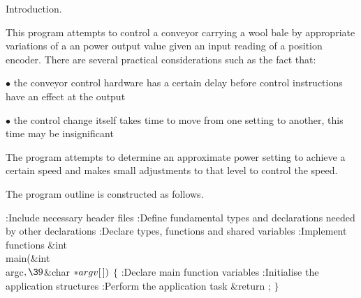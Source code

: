 
%
%

\acrofalse
\def\title{TITLE}


\def\startlist{\medskip\leftskip=2pc}
\def\endlist{\medskip\leftskip=0pt}
\def\label#1{\expandafter\let\csname lbl#1\endcsname\secno}
\def\ref#1{\csname lbl#1\endcsname}
	
\noinx
\nosecs
\nocon
\noatl
%



Introduction.\medskip

\noindent
This program attempts to control a conveyor carrying a wool bale
by appropriate variations of a an power output value
given an input reading of a position encoder. There
are several practical considerations such as the fact that:

\startlist
$\bullet$ the conveyor control hardware has a certain delay before
control instructions have an effect at the output

$\bullet$ the control change itself takes time to move from
one setting to another, this time may be insignificant

\endlist

The program attempts to determine an approximate power setting
to achieve a certain speed and makes small adjustments to that level
to control the speed.

The program outline is constructed as follows.

\Y\B{}:Include necessary header files\X\6
\ATH\6
:Define fundamental types and declarations needed by other declarations\X\6
:Declare types, functions and shared variables\X\6
:Implement functions\X\7
\&{int} \\{main}(\&{int} \\{argc}${},\39{}$\&{char} ${}{*}\\{argv}[\,]){}$\1\1%
\2\2\6
${}\{{}$\1\6
:Declare main function variables\X\6
:Initialise the application structures\X\6
:Perform the application task\X\6
\&{return} ;\6
\4${}\}{}$\2\par
\fi

